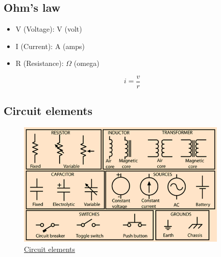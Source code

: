 \subsection{Ohm's law}
\begin{itemize}
  \item V (Voltage): V (volt)
  \item I (Current): A (amps)
  \item R (Resistance): $\Omega$ (omega)
\end{itemize}

\begin{equation} i = \frac{v}{r} \end{equation}


\subsection{Circuit elements}
\begin{figure}[h]
    \vspace{10mm}
    \centering
    \includegraphics[width=10cm]{image/circuit-elements.png}
    \caption{\href{http://hyperphysics.phy-astr.gsu.edu/hbasees/Electronic/cktelcon.html}{Circuit elements}}
\end{figure}



